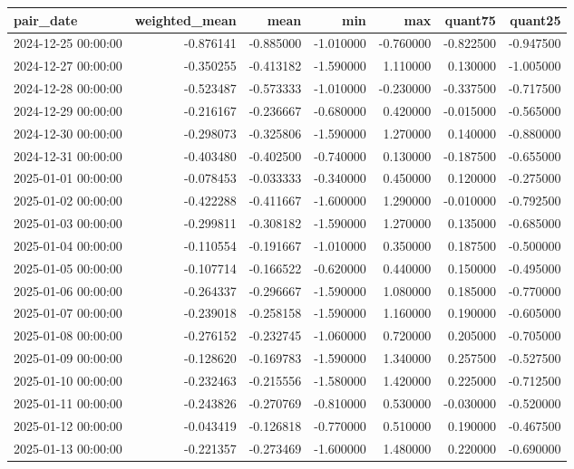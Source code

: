 \begin{tabular}{lrrrrrr}
\toprule
pair_date & weighted_mean & mean & min & max & quant75 & quant25 \\
\midrule
2024-12-25 00:00:00 & -0.876141 & -0.885000 & -1.010000 & -0.760000 & -0.822500 & -0.947500 \\
2024-12-27 00:00:00 & -0.350255 & -0.413182 & -1.590000 & 1.110000 & 0.130000 & -1.005000 \\
2024-12-28 00:00:00 & -0.523487 & -0.573333 & -1.010000 & -0.230000 & -0.337500 & -0.717500 \\
2024-12-29 00:00:00 & -0.216167 & -0.236667 & -0.680000 & 0.420000 & -0.015000 & -0.565000 \\
2024-12-30 00:00:00 & -0.298073 & -0.325806 & -1.590000 & 1.270000 & 0.140000 & -0.880000 \\
2024-12-31 00:00:00 & -0.403480 & -0.402500 & -0.740000 & 0.130000 & -0.187500 & -0.655000 \\
2025-01-01 00:00:00 & -0.078453 & -0.033333 & -0.340000 & 0.450000 & 0.120000 & -0.275000 \\
2025-01-02 00:00:00 & -0.422288 & -0.411667 & -1.600000 & 1.290000 & -0.010000 & -0.792500 \\
2025-01-03 00:00:00 & -0.299811 & -0.308182 & -1.590000 & 1.270000 & 0.135000 & -0.685000 \\
2025-01-04 00:00:00 & -0.110554 & -0.191667 & -1.010000 & 0.350000 & 0.187500 & -0.500000 \\
2025-01-05 00:00:00 & -0.107714 & -0.166522 & -0.620000 & 0.440000 & 0.150000 & -0.495000 \\
2025-01-06 00:00:00 & -0.264337 & -0.296667 & -1.590000 & 1.080000 & 0.185000 & -0.770000 \\
2025-01-07 00:00:00 & -0.239018 & -0.258158 & -1.590000 & 1.160000 & 0.190000 & -0.605000 \\
2025-01-08 00:00:00 & -0.276152 & -0.232745 & -1.060000 & 0.720000 & 0.205000 & -0.705000 \\
2025-01-09 00:00:00 & -0.128620 & -0.169783 & -1.590000 & 1.340000 & 0.257500 & -0.527500 \\
2025-01-10 00:00:00 & -0.232463 & -0.215556 & -1.580000 & 1.420000 & 0.225000 & -0.712500 \\
2025-01-11 00:00:00 & -0.243826 & -0.270769 & -0.810000 & 0.530000 & -0.030000 & -0.520000 \\
2025-01-12 00:00:00 & -0.043419 & -0.126818 & -0.770000 & 0.510000 & 0.190000 & -0.467500 \\
2025-01-13 00:00:00 & -0.221357 & -0.273469 & -1.600000 & 1.480000 & 0.220000 & -0.690000 \\

\end{tabular}
